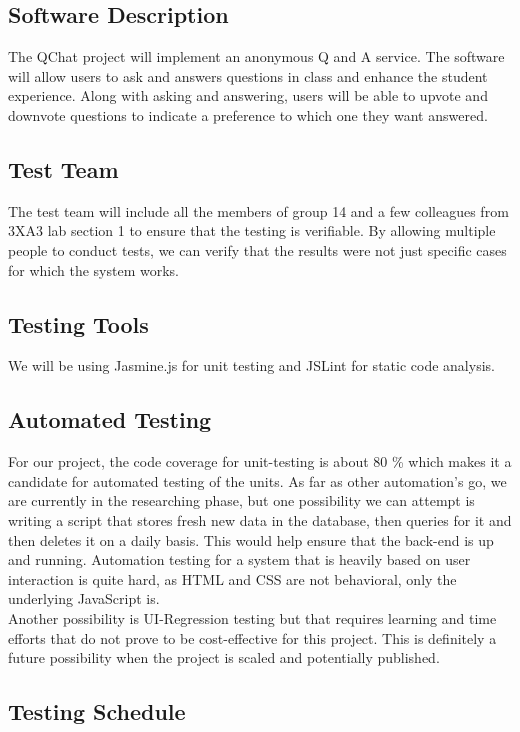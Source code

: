 \documentclass[12pt, titlepage]{article}
\begin{document}
\subsection{Software Description}
The QChat project will implement an anonymous Q and A service. The software will allow users to ask and answers questions in class and enhance the student experience. Along with asking and answering, users will be able to upvote and downvote questions to indicate a preference to which one they want answered. 

\subsection{Test Team}
The test team will include all the members of group 14 and a few colleagues from 3XA3 lab section 1 to ensure that the testing is verifiable. By allowing multiple people to conduct tests, we can verify that the results were not just specific cases for which the system works.

\subsection{Testing Tools}
We will be using Jasmine.js for unit testing and JSLint for static code analysis.

\subsection{Automated Testing}
For our project, the code coverage for unit-testing is about 80 \% which makes it a candidate for automated testing of the units. As far as other automation's go, we are currently in the researching phase, but one possibility we can attempt is writing a script that stores fresh new data in the database, then queries for it and then deletes it on a daily basis. This would help ensure that the back-end is up and running. Automation testing for a system that is heavily based on user interaction is quite hard, as HTML and CSS are not behavioral, only the underlying JavaScript is.\\

Another possibility is UI-Regression testing but that requires learning and time efforts that do not prove to be cost-effective for this project. This is definitely a future possibility when the project is scaled and potentially published. 

\subsection{Testing Schedule}
		
\end{document}
